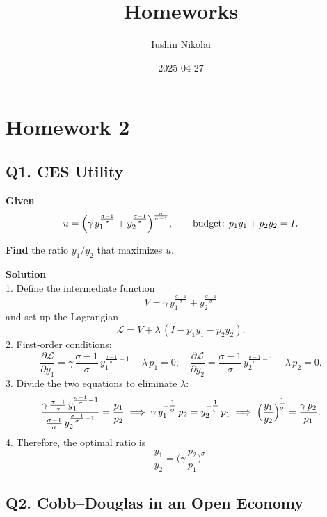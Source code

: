 \documentclass[
]{article}
\title{Homeworks}
\author{Iushin Nikolai}
\date{2025-04-27}
\begin{document}
\maketitle

{
\setcounter{tocdepth}{2}
\tableofcontents
}
\section{Homework 2}\label{homework-2}

\subsection{Q1. CES Utility}\label{q1.-ces-utility}

\textbf{Given}\\
\[
u = \Bigl(\gamma\,y_{1}^{\frac{\sigma-1}{\sigma}} + y_{2}^{\frac{\sigma-1}{\sigma}}\Bigr)^{\frac{\sigma}{\sigma-1}},
\qquad
\text{budget: }p_{1}y_{1} + p_{2}y_{2} = I.
\]

\textbf{Find} the ratio \(y_{1}/y_{2}\) that maximizes \(u\).

\textbf{Solution}\\
1. Define the intermediate function\\
\[
   V = \gamma\,y_{1}^{\frac{\sigma-1}{\sigma}} + y_{2}^{\frac{\sigma-1}{\sigma}}
   \] and set up the Lagrangian\\
\[
   \mathcal{L} = V + \lambda\,(I - p_{1}y_{1} - p_{2}y_{2}).
   \] 2. First‐order conditions:\\
\[
   \frac{\partial\mathcal{L}}{\partial y_{1}}
   = \gamma\,\frac{\sigma-1}{\sigma}\,y_{1}^{\frac{\sigma-1}{\sigma}-1} - \lambda\,p_{1} = 0,
   \quad
   \frac{\partial\mathcal{L}}{\partial y_{2}}
   = \frac{\sigma-1}{\sigma}\,y_{2}^{\frac{\sigma-1}{\sigma}-1} - \lambda\,p_{2} = 0.
   \] 3. Divide the two equations to eliminate \(\lambda\):\\
\[
   \frac{\gamma\,\frac{\sigma-1}{\sigma}\,y_{1}^{\frac{\sigma-1}{\sigma}-1}}{\frac{\sigma-1}{\sigma}\,y_{2}^{\frac{\sigma-1}{\sigma}-1}}
   = \frac{p_{1}}{p_{2}}
   \;\Longrightarrow\;
   \gamma\,y_{1}^{-\tfrac{1}{\sigma}}\,p_{2}
   = y_{2}^{-\tfrac{1}{\sigma}}\,p_{1}
   \;\Longrightarrow\;
   \Bigl(\frac{y_{1}}{y_{2}}\Bigr)^{\!\tfrac{1}{\sigma}}
   = \frac{\gamma\,p_{2}}{p_{1}}.
   \] 4. Therefore, the optimal ratio is\\
\[
   \boxed{
     \frac{y_{1}}{y_{2}}
     = \biggl(\gamma\,\frac{p_{2}}{p_{1}}\biggr)^{\!\sigma}
   }.
   \]

\subsection{Q2. Cobb--Douglas in an Open
Economy}\label{q2.-cobbdouglas-in-an-open-economy}
\end{document}
